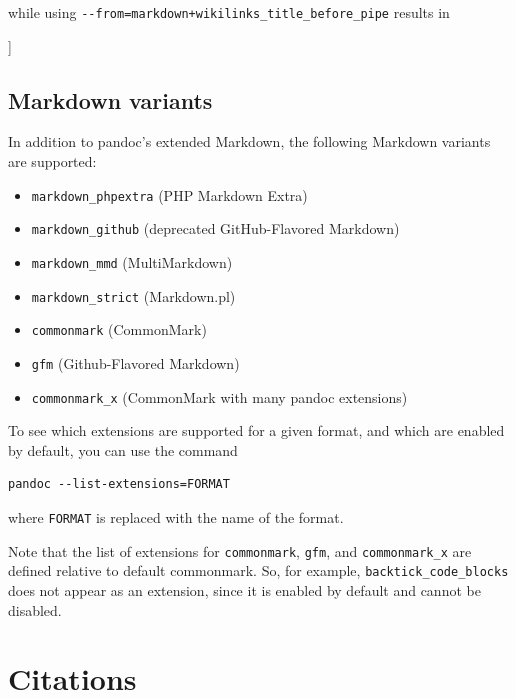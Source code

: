 \documentclass[
  b5paper
]{book}
\newenvironment{Shaded}{}{}
\newcommand{\NormalTok}[1]{#1}
\providecommand{\tightlist}{%
  \setlength{\itemsep}{0pt}\setlength{\parskip}{0pt}}
\begin{document}
while using \texttt{-\/-from=markdown+wikilinks\_title\_before\_pipe}
results in

\begin{Shaded}
\begin{Highlighting}[]
\NormalTok{[[title|URL]]}
\end{Highlighting}
\end{Shaded}

\section{Markdown variants}\label{markdown-variants}

In addition to pandoc's extended Markdown, the following Markdown
variants are supported:

\begin{itemize}
\tightlist
\item
  \texttt{markdown\_phpextra} (PHP Markdown Extra)
\item
  \texttt{markdown\_github} (deprecated GitHub-Flavored Markdown)
\item
  \texttt{markdown\_mmd} (MultiMarkdown)
\item
  \texttt{markdown\_strict} (Markdown.pl)
\item
  \texttt{commonmark} (CommonMark)
\item
  \texttt{gfm} (Github-Flavored Markdown)
\item
  \texttt{commonmark\_x} (CommonMark with many pandoc extensions)
\end{itemize}

To see which extensions are supported for a given format, and which are
enabled by default, you can use the command

\begin{verbatim}
pandoc --list-extensions=FORMAT
\end{verbatim}

where \texttt{FORMAT} is replaced with the name of the format.

Note that the list of extensions for \texttt{commonmark}, \texttt{gfm},
and \texttt{commonmark\_x} are defined relative to default commonmark.
So, for example, \texttt{backtick\_code\_blocks} does not appear as an
extension, since it is enabled by default and cannot be disabled.

\chapter{Citations}\label{citations}
\end{document}
